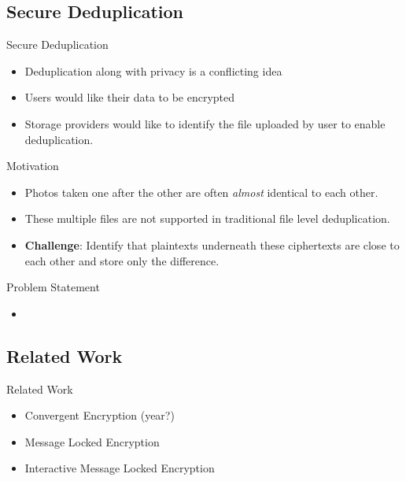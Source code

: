 \documentclass{beamer}
\begin{document}
\subsection{Secure Deduplication}


\begin{frame}{Secure Deduplication}
\begin{itemize}
	\setlength\itemsep{1em}
	\item Deduplication along with privacy is a conflicting idea
	\item Users would like their data to be encrypted
	
	\item Storage providers would like to identify the file uploaded by user
		to enable deduplication.
\end{itemize}
\end{frame}

\begin{frame}{Motivation}
\begin{itemize}
	\setlength\itemsep{1em}
	\item Photos taken one after the other are often \textit{almost} identical to each other.
	\item These multiple files are not supported in traditional file level deduplication.
	\item \textbf{Challenge}: Identify that plaintexts underneath these ciphertexts are 
		close to each other and store only the difference.
\end{itemize}
\end{frame}

\begin{frame}{Problem Statement}
	\begin{itemize}
	\setlength\itemsep{1em}
		\item 
	\end{itemize}
\end{frame}

\subsection{Related Work}

\begin{frame}{Related Work}
	\begin{itemize}
		\setlength\itemsep{1em}
		\item Convergent Encryption (year?)
		\item Message Locked Encryption
		\item Interactive Message Locked Encryption
	\end{itemize}

\end{frame}
\end{document}
